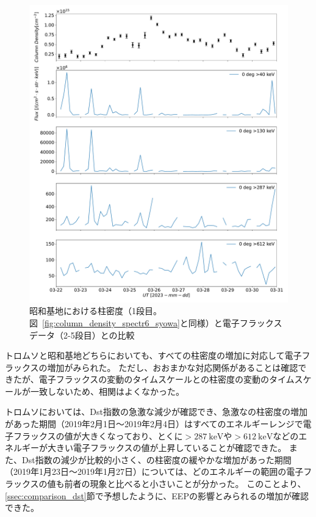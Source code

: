\begin{figure}[htbp]
    \centering
    \includegraphics[width=\linewidth]{master_thesis_contents/master_thesis_fig/column_density_spectr6_poes0deg_syowa.pdf}
    \caption{昭和基地における柱密度（1段目。図~\ref{fig:column_density_spectr6_syowa}と同様）と電子フラックスデータ（2-5段目）との比較}
    \label{fig:poes_mmcd_syowa}
\end{figure} \par

トロムソと昭和基地どちらにおいても、すべての柱密度の増加に対応して電子フラックスの増加がみられた。
ただし、おおまかな対応関係があることは確認できたが、電子フラックスの変動のタイムスケールとの柱密度の変動のタイムスケールが一致しないため、相関はよくなかった。\par

トロムソにおいては、Dst指数の急激な減少が確認でき、急激なの柱密度の増加があった期間（2019年2月1日〜2019年2月4日）はすべてのエネルギーレンジで電子フラックスの値が大きくなっており、とくに$>287\ \mathrm{keV}$や$>612\ \mathrm{keV}$などのエネルギーが大きい電子フラックスの値が上昇していることが確認できた。
また、Dst指数の減少が比較的小さく、の柱密度の緩やかな増加があった期間（2019年1月23日〜2019年1月27日）については、どのエネルギーの範囲の電子フラックスの値も前者の現象と比べると小さいことが分かった。
このことより、\ref{ssec:comparison_dst}節で予想したように、EEPの影響とみられるの増加が確認できた。\par

